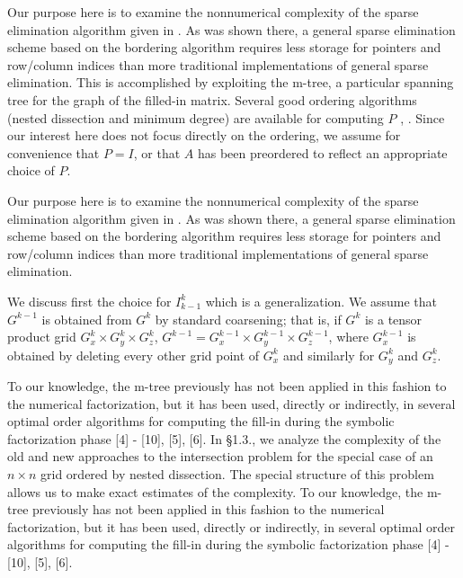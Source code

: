 \documentclass[twoside,leqno,twocolumn]{article}
\begin{document}
Our purpose here is to examine the nonnumerical complexity of the
sparse elimination algorithm given in  \cite{BANKSMITH}.
As was shown there, a general sparse elimination scheme based on the
bordering algorithm requires less storage for pointers and
row/column indices than more traditional implementations of general
sparse elimination.  This is accomplished by exploiting the m-tree,
a particular spanning tree for the graph of the filled-in matrix.
Several good ordering algorithms (nested dissection and minimum degree)
are available for computing $P$  \cite{GEORGELIU}, \cite{ROSE72}.
Since our interest here does not
focus directly on the ordering, we assume for convenience that $P=I$,
or that $A$ has been preordered to reflect an appropriate choice of $P$.

Our purpose here is to examine the nonnumerical complexity of the
sparse elimination algorithm given in  \cite{BANKSMITH}.
As was shown there, a general sparse elimination scheme based on the
bordering algorithm requires less storage for pointers and
row/column indices than more traditional implementations of general
sparse elimination.  

\begin{lemma} We discuss first the choice for $I_{k-1}^k$
which is a generalization. We assume that $G^{k-1}$ is
obtained
from $G^k$
by standard coarsening; that is, if $G^k$ is a tensor product
grid $G_{x}^k \times G_{y}^k \times G_{z}^k$,
$G^{k-1}=G_{x}^{k-1} \times G_{y}^{k-1} \times G_{z}^{k-1}$,
where $G_{x}^{k-1}$ is obtained by deleting every other grid
point of $G_x^k$ and similarly for $G_{y}^k$ and $G_{z}^k$.
\end{lemma}
 
To our knowledge, the m-tree previously has not been applied in this
fashion to the numerical factorization, but it has been used,
directly or indirectly, in several optimal order algorithms for
computing the fill-in during the symbolic factorization phase
[4] - [10], [5], [6]. In \S 1.3., we analyze the complexity of the old and new
approaches to the intersection problem for the special case of
an $n \times n$ grid ordered by nested dissection. The special
structure of this problem allows us to make exact estimates of
the complexity. To our knowledge, the m-tree previously has not been applied in this
fashion to the numerical factorization, but it has been used,
directly or indirectly, in several optimal order algorithms for
computing the fill-in during the symbolic factorization phase
[4] - [10], [5], [6].
\end{document}
